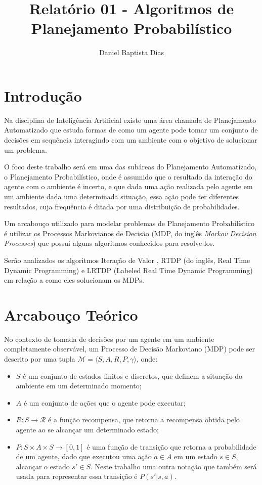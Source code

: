 \documentclass[letterpaper]{article}
\title{Relatório 01 - Algoritmos de Planejamento Probabilístico}
\author{Daniel Baptista Dias}
\begin{document}
\maketitle

\section{Introdução}
\label{sec:introducao}

Na disciplina de Inteligência Artificial existe uma área chamada de Planejamento Automatizado
que estuda formas de como um agente pode tomar um conjunto de decisões em sequência interagindo
com um ambiente com o objetivo de solucionar um problema.

O foco deste trabalho será em uma das subáreas do Planejamento Automatizado, o Planejamento Probabilístico, onde
é assumido que o resultado da interação do agente com o ambiente é incerto, e que dada uma ação realizada pelo agente
em um ambiente dada uma determinada situação, essa ação pode ter diferentes resultados, cuja frequência é ditada por
uma distribuição de probabilidades.

Um arcabouço utilizado para modelar problemas de Planejamento Probabilístico é utilizar os Processos Markovianos de Decisão
(MDP, do inglês \textit{Markov Decision Processes})\cite{Puterman-1994} que possui alguns algoritmos conhecidos para resolve-los.

Serão analizados os algoritmos Iteração de Valor \cite{Howard-1960}, RTDP (do inglês, Real Time Dynamic Programming)
\cite{BartoBradtkeSingh-1995} e LRTDP (Labeled Real Time Dynamic Programming) \cite{BonetGeffer-2003} em relação a como eles
solucionam os MDPs.

\section{Arcabouço Teórico}

No contexto de tomada de decisões por um agente em um ambiente completamente observável, um Processo de Decisão Markoviano (MDP)
pode ser descrito por uma tupla $\mathcal{M}=\langle S,A,R,P,\gamma \rangle$, onde:

\begin{itemize}
    \item $S$ é um conjunto de estados finitos e discretos, que definem a situação do ambiente em um determinado momento;
    \item $A$ é um conjunto de ações que o agente pode executar;
    \item $R : S \rightarrow \mathcal{R} $ é a função recompensa, que retorna a recompensa obtida pelo agente ao se alcançar um determinado estado;
    \item $P : S \times A \times S \rightarrow [0, 1]$ é uma função de transição que retorna a probabilidade de um agente, dado que executou uma ação $a \in A$ em um estado $s \in S$, alcançar o estado $s' \in S$. Neste trabalho uma outra notação que também será usada para representar essa transição é $P(s'|s,a)$.
\end{itemize}
\end{document}
